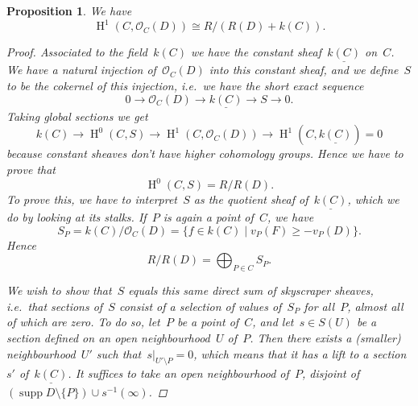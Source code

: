 \documentclass[10pt,a4paper]{article}
\theoremstyle{lecture}
\newtheorem{proposition}[theorem]{Proposition}
\DeclareMathOperator\HH{H}
\DeclareMathOperator\supp{supp}
\begin{document}
\begin{proposition}
  \label{proposition:HH1}
  We have
  \begin{equation}
    \HH^1(C,\mathcal{O}_C(D))\cong R/(R(D)+k(C)).
  \end{equation}

  \begin{proof}
    Associated to the field~$k(C)$ we have the constant sheaf~$\underline{k(C)}$ on~$C$. We have a natural injection of~$\mathcal{O}_C(D)$ into this constant sheaf, and we define~$S$ to be the cokernel of this injection, i.e.\ we have the short exact sequence
    \begin{equation}
      0\to\mathcal{O}_C(D)\to\underline{k(C)}\to S\to 0.
    \end{equation}
    Taking global sections we get
    \begin{equation}
      k(C)\to\HH^0(C,S)\to\HH^1(C,\mathcal{O}_C(D))\to\HH^1(C,\underline{k(C)})=0
    \end{equation}
    because constant sheaves don't have higher cohomology groups. Hence we have to prove that
    \begin{equation}
      \HH^0(C,S)=R/R(D).
    \end{equation}
    To prove this, we have to interpret~$S$ as the quotient sheaf of~$\underline{k(C)}$, which we do by looking at its stalks. If~$P$ is again a point of~$C$, we have
    \begin{equation}
      S_P=k(C)/\mathcal{O}_C(D)=\{f\in k(C)\mid v_P(F)\geq -v_P(D)\}.
    \end{equation}
    Hence
    \begin{equation}
      R/R(D)=\bigoplus_{P\in C}S_P.
    \end{equation}

    We wish to show that~$S$ equals this same direct sum of skyscraper sheaves, i.e.\ that sections of~$S$ consist of a selection of values of~$S_P$ for all~$P$, almost all of which are zero. To do so, let~$P$ be a point of~$C$, and let~$s\in S(U)$ be a section defined on an open neighbourhood~$U$ of~$P$. Then there exists a (smaller) neighbourhood~$U'$ such that~$s|_{U'\setminus P}=0$, which means that it has a lift to a section~$s'$ of~$\underline{k(C)}$. It suffices to take an open neighbourhood of~$P$, disjoint of~$(\supp D\setminus\{P\})\cup s^{-1}(\infty)$.
  \end{proof}
\end{proposition}
\end{document}
